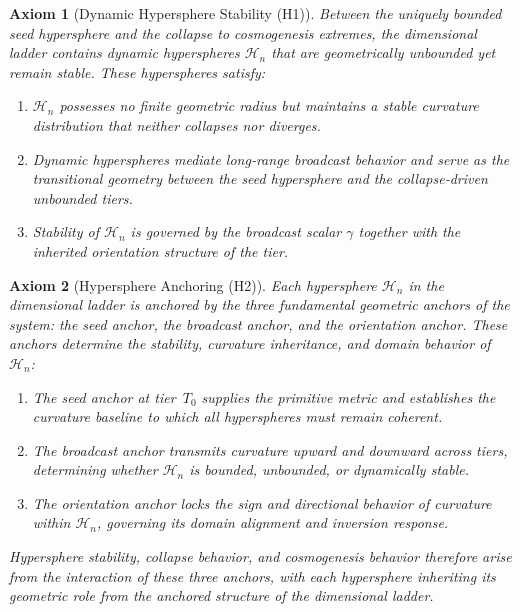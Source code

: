 \documentclass[final,onefignum,onetabnum]{siamart}
\newtheorem{axiom}{Axiom}
\begin{document}
\begin{axiom}[Dynamic Hypersphere Stability (H1)]
Between the uniquely bounded seed hypersphere and the collapse to cosmogenesis extremes, the dimensional ladder contains dynamic hyperspheres $\mathcal{H}_{n}$ that are geometrically unbounded yet remain stable. These hyperspheres satisfy:

\begin{enumerate}
    \item $\mathcal{H}_{n}$ possesses no finite geometric radius but maintains a stable curvature distribution that neither collapses nor diverges.
    \item Dynamic hyperspheres mediate long‑range broadcast behavior and serve as the transitional geometry between the seed hypersphere and the collapse‑driven unbounded tiers.
    \item Stability of $\mathcal{H}_{n}$ is governed by the broadcast scalar $\gamma$ together with the inherited orientation structure of the tier.
\end{enumerate}
\end{axiom}

\begin{axiom}[Hypersphere Anchoring (H2)]
Each hypersphere $\mathcal{H}_n$ in the dimensional ladder is anchored by the three fundamental geometric anchors of the system: the seed anchor, the broadcast anchor, and the orientation anchor. These anchors determine the stability, curvature inheritance, and domain behavior of $\mathcal{H}_n$:

\begin{enumerate}
\item The seed anchor at tier~$T_0$ supplies the primitive metric and establishes the curvature baseline to which all hyperspheres must remain coherent.
\item The broadcast anchor transmits curvature upward and downward across tiers, determining whether $\mathcal{H}_n$ is bounded, unbounded, or dynamically stable.
\item The orientation anchor locks the sign and directional behavior of curvature within $\mathcal{H}_n$, governing its domain alignment and inversion response.
\end{enumerate}

Hypersphere stability, collapse behavior, and cosmogenesis behavior therefore arise from the interaction of these three anchors, with each hypersphere inheriting its geometric role from the anchored structure of the dimensional ladder.
\end{axiom}
\end{document}
